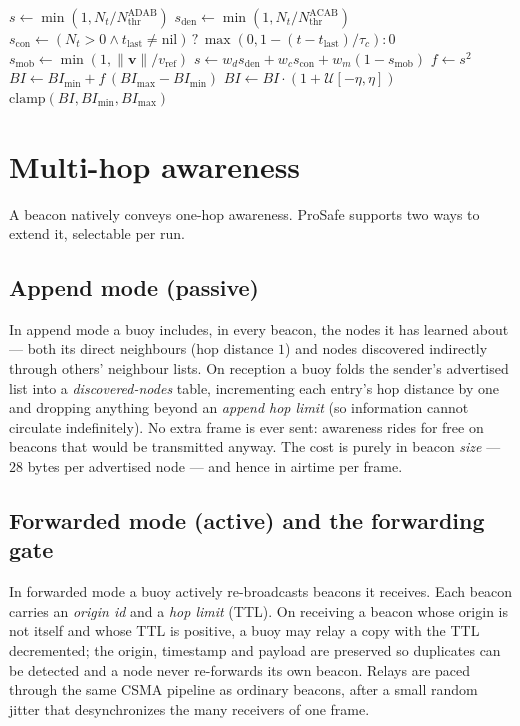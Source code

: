 \documentclass[12pt,a4paper,oneside]{report}
\newcommand{\bimin}{BI_{\min}}
\newcommand{\bimax}{BI_{\max}}
\newcommand{\nthr}{N_{\mathrm{thr}}}
\begin{document}
\begin{algorithm}[t]
\caption{Adaptive interval computation (shared by ADAB and ACAB)}
\label{alg:interval}
\begin{algorithmic}[1]
     \State $s \gets \min(1, N_t / \nthr^{\mathrm{ADAB}})$
     \State $s_{\mathrm{den}} \gets \min(1, N_t / \nthr^{\mathrm{ACAB}})$
     \State $s_{\mathrm{con}} \gets (N_t>0 \wedge t_{\text{last}}\!\neq\!\mathrm{nil})\,?\,\max(0,1-(t-t_{\text{last}})/\tau_c) : 0$
     \State $s_{\mathrm{mob}} \gets \min(1, \lVert\mathbf{v}\rVert / v_{\text{ref}})$
     \State $s \gets w_d s_{\mathrm{den}} + w_c s_{\mathrm{con}} + w_m (1-s_{\mathrm{mob}})$
  \EndIf
  \State $f \gets s^2$ 
  \State $BI \gets \bimin + f\,(\bimax-\bimin)$
  \State $BI \gets BI \cdot (1 + \mathcal{U}[-\eta,\eta])$ 
  \State \Return $\mathrm{clamp}(BI, \bimin, \bimax)$
\EndFunction
\end{algorithmic}
\end{algorithm}

\section{Multi-hop awareness}
\label{sec:multihop}
A beacon natively conveys one-hop awareness. ProSafe supports two ways to extend
it, selectable per run.

\subsection{Append mode (passive)}
In append mode a buoy includes, in every beacon, the nodes it has learned about
--- both its direct neighbours (hop distance $1$) and nodes discovered
indirectly through others' neighbour lists. On reception a buoy folds the
sender's advertised list into a \emph{discovered-nodes} table, incrementing each
entry's hop distance by one and dropping anything beyond an
\emph{append hop limit} (so information cannot circulate indefinitely). No extra
frame is ever sent: awareness rides for free on beacons that would be
transmitted anyway. The cost is purely in beacon \emph{size} --- $28$ bytes per
advertised node --- and hence in airtime per frame.

\subsection{Forwarded mode (active) and the forwarding gate}
In forwarded mode a buoy actively re-broadcasts beacons it receives. Each beacon
carries an \emph{origin id} and a \emph{hop limit} (TTL). On receiving a beacon
whose origin is not itself and whose TTL is positive, a buoy may relay a copy
with the TTL decremented; the origin, timestamp and payload are preserved so
duplicates can be detected and a node never re-forwards its own beacon. Relays
are paced through the same CSMA pipeline as ordinary beacons, after a small
random jitter that desynchronizes the many receivers of one frame.
\end{document}
